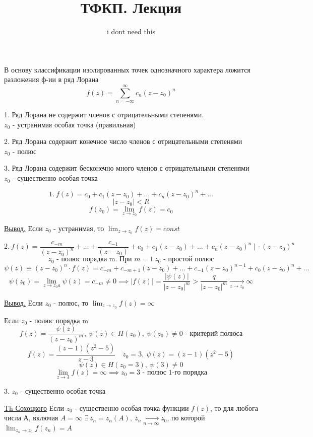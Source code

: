 \documentclass[a4paper]{article}
\begin{document}
\title{ТФКП. Лекция}
\author{i dont need this}
\maketitle

В основу классификации изолированных точек однозначного характера
ложится разложения ф-ии в ряд Лорана
\[
    f(z) = \sum_{n=-\infty}^{\infty} c_n(z-z_0)^{n}
\]

1. Ряд Лорана не содержит членов с отрицательными степенями.\\
$ z_0 $ - устранимая особая точка (правильная)

2. Ряд Лорана содержит конечное число членов с отрицательными степенями\\
$ z_0 $ - полюс

3. Ряд Лорана содержит бесконечно много членов с отрицательными степенями\\
$ z_0 $ - существенно особая точка

\[
    1. \ f(z) = c_0 + c_1 (z - z_0) + \dots + c_n (z - z_0)^{n} + \dots
\]
\[
    |z-z_0| < R
\]
\[
    f(z_0) = \lim_{z \to z_0} f(z) = c_0
\]

\underline{Вывод.} Если $ z_0 $ - устранимая, то $ \lim_{z \to z_0} f(z) = const $ 

\[
    2. \ f(z) = \frac{c_{-m}}{(z-z_0)^{n}} + \dots + \frac{c_{-1}}{(z-z_0)} 
    + c_0 + c_1(z-z_0) + \dots + c_n(z-z_0)^{n} \ | \ \cdot (z-z_0)^{n}
\]
\[
    z_0 \text{ - полюс порядка m. При } m = 1 \ z_0 \text{ - простой полюс}
\]
\[
    \psi(z) \equiv (z-z_0)^{n} \cdot f(z) = c_{-m} + c_{-m + 1}(z-z_0) + \dots
    + c_{-1}(z-z_0)^{n-1} + c_0(z-z_0)^{n} + \dots
\]
\[
    \psi(z_0) = \lim_{z \to z_0a} \psi(z) = c_{-m} \neq 0 \implies
    |f(z)| = \frac{|\psi(z)|}{|z-z_0|^{m}} > \frac{q}{|z-z_0|^{m}} \xrightarrow[z \to z_0]{}
    \infty
\]

\underline{Вывод.} Если $ z_0 $ - полюс, то $ \lim_{z \to z_0} f(z) = \infty $ 

Если $ z_0 $ - полюс порядка m
\[
    f(z) = \frac{\psi(z)}{(z-z_0)^{m}}, \ \psi(z) \in H(z_0), \ \psi(z_0) \neq 0
    \text{ - критерий полюса}
\]
\[
    f(z) = \frac{(z-1)(z^2 - 5)}{z-3} \quad z_0 = 3, \ \psi(z) = (z-1)(z^2 - 5) 
\]
\[
    \psi(z) \in H(z_0 =3), \ \psi(3) \neq 0
\]
\[
    \lim_{z \to 3} f(z) = \infty \implies z_0 = 3 \text{ - полюс 1-го порядка}
\]

3. $ z_0 $ - существенно особая точка
\begin{tcolorbox}
\underline{Th Сохоцкого} Если $ z_0 $ - существенно особая точка функции $ f(z) $,
то для любога числа А, включая $ A = \infty $ $ \exists \, z_n=z_n(A), \ 
z_n \xrightarrow[n \to \infty]{} z_0$, по которой $ \lim_{z_n \to z_0} f(z_n) = A $ 
\end{tcolorbox}
\end{document}
